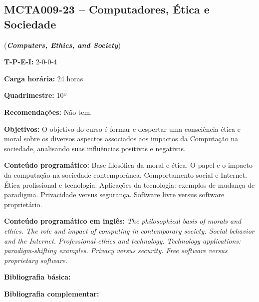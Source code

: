 \documentclass[class=article, crop=false]{standalone}
\begin{document}
\subsection*{MCTA009-23 -- Computadores, Ética e Sociedade}
\label{disc:ces}

(\textbf{\textit{Computers, Ethics, and Society}})

\begin{center}
    \begin{minipage}{0.85\textwidth}
        \textbf{T-P-E-I:} 2-0-0-4
        
        \textbf{Carga horária:} 24 horas
        
        \textbf{Quadrimestre:} 10º
        
        \textbf{Recomendações:} Não tem.
    \end{minipage}
\end{center}

\textbf{Objetivos:}
O objetivo do curso é formar e despertar uma consciência ética e moral sobre os
diversos aspectos associados aos impactos da Computação na sociedade,
analisando suas influências positivas e negativas.

\textbf{Conteúdo programático:}
Base filosófica da moral e ética.
O papel e o impacto da computação na sociedade contemporânea.
Comportamento social e Internet.
Ética profissional e tecnologia.
Aplicações da tecnologia: exemplos de mudança de paradigma.
Privacidade versus segurança.
Software livre versus software proprietário.

\textbf{Conteúdo programático em inglês:}
\textit{The philosophical basis of morals and ethics.
The role and impact of computing in contemporary society. 
Social behavior and the Internet. 
Professional ethics and technology. 
Technology applications: paradigm-shifting examples. 
Privacy versus security. 
Free software versus proprietary software.}

\newrefsection
\textbf{Bibliografia básica:}
\nocite{2017-vazquez, 2020-maciel-viterbo, 2020-maciel-viterboa} 
\printbibliography

\newrefsection
\textbf{Bibliografia complementar:}
\nocite{2011-dupas, 2008-masiero, 2004-lessig, 2010-levy}
\printbibliography
\end{document}
